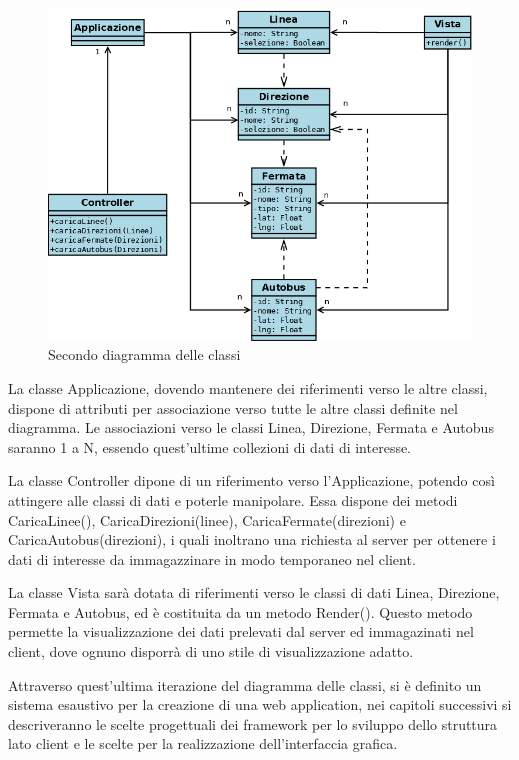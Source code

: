 \vspace{1cm}
\begin{figure}[htbp]
\begin{center}
\includegraphics[width=13cm]{contents/images/dcd2}
\end{center}
\caption{Secondo diagramma delle classi}
\label{fig:placeholder}
\end{figure}
\vspace{1cm}

La classe Applicazione, dovendo mantenere dei riferimenti verso le altre classi, dispone di attributi per associazione verso tutte le altre classi definite nel diagramma. Le associazioni verso le classi Linea, Direzione, Fermata e Autobus saranno 1 a N, essendo quest'ultime collezioni di dati di interesse.

La classe Controller dipone di un riferimento verso l'Applicazione, potendo così attingere alle classi di dati e poterle manipolare. Essa dispone dei metodi CaricaLinee(), CaricaDirezioni(linee), CaricaFermate(direzioni) e CaricaAutobus(direzioni), i quali inoltrano una richiesta al server per ottenere i dati di interesse da immagazzinare in modo temporaneo nel client.

La classe Vista sarà dotata di riferimenti verso le classi di dati Linea, Direzione, Fermata e Autobus, ed è costituita da un metodo Render(). Questo metodo permette la visualizzazione dei dati prelevati dal server ed immagazinati nel client, dove ognuno disporrà di uno stile di visualizzazione adatto.


Attraverso quest'ultima iterazione del diagramma delle classi, si è definito un sistema esaustivo per la creazione di una web application, nei capitoli successivi si descriveranno le scelte progettuali dei framework per lo sviluppo dello struttura lato client e le scelte per la realizzazione dell'interfaccia grafica.

\newpage
